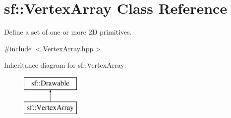 \hypertarget{classsf_1_1VertexArray}{\section{sf\-:\-:Vertex\-Array Class Reference}
\label{classsf_1_1VertexArray}
}


Define a set of one or more 2\-D primitives.  




{\ttfamily \#include $<$Vertex\-Array.\-hpp$>$}

Inheritance diagram for sf\-:\-:Vertex\-Array\-:\begin{figure}[H]
\begin{center}
\leavevmode
\includegraphics[height=2.000000cm]{classsf_1_1VertexArray}
\end{center}
\end{figure}
